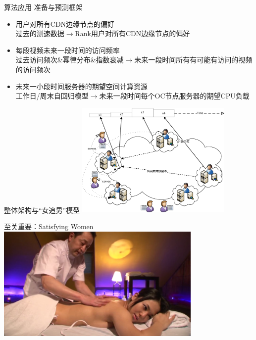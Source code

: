 \documentclass{beamer}
\begin{document}
\begin{frame}{算法应用}
准备与预测框架\\
\begin{itemize}
\item 用户对所有CDN边缘节点的偏好\\
过去的测速数据$\rightarrow$Rank用户对所有CDN边缘节点的偏好
\item 每段视频未来一段时间的访问频率\\
过去访问频次\&幂律分布\&指数衰减$\rightarrow$未来一段时间所有有可能有访问的视频的访问频次
\item 未来一小段时间服务器的期望空间计算资源\\
工作日/周末自回归模型$\rightarrow$未来一段时间每个OC节点服务器的期望CPU负载
\end{itemize}
\end{frame}
\begin{frame}{整体架构与“女追男”模型}
\includegraphics[height=5.6cm]{fig/transcoding_delivery.pdf}
\end{frame}
\begin{frame}{至关重要：Satisfying Women}
\includegraphics[height=5.6cm]{fig/massage2.png}
\end{frame}
\end{document}
